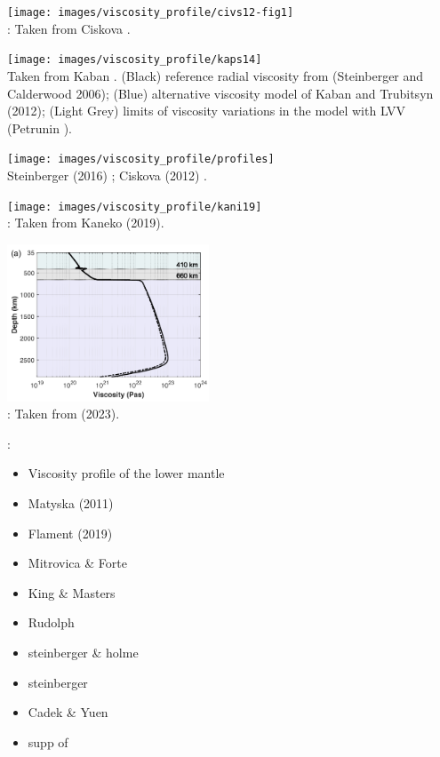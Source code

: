 \begin{center}
\texttt{[image: images/viscosity\_profile/civs12-fig1]}\\
{\captionfont \twothousandtwelve: Taken from Ciskova \etal \cite{civs12}.}
\end{center}

\begin{center}
\texttt{[image: images/viscosity\_profile/kaps14]}\\
{\captionfont \twothousandfourteen Taken from Kaban \etal  \cite{kaps14}.
(Black) reference radial viscosity from (Steinberger and Calderwood 2006); 
(Blue) alternative viscosity model of Kaban and Trubitsyn (2012); 
(Light Grey) limits of viscosity variations in the model with LVV (Petrunin ).
}
\end{center}

\begin{center}
\texttt{[image: images/viscosity\_profile/profiles]}\\
{\captionfont Steinberger (2016) \cite{stei16}; 
Ciskova \etal (2012) \cite{civs12}.}
\end{center}

\begin{center}
\texttt{[image: images/viscosity\_profile/kani19]}\\
{\captionfont \twothousandnineteen: Taken from Kaneko \etal \cite{kani19} (2019).}
\end{center}

\begin{center}
\includegraphics[width=6cm]{images/viscosity_profile/nemi23}\\
{\captionfont \twothousandtwentythree: Taken from \textcite{nemi23} (2023).}
\end{center}


\Literature:
\begin{itemize} 
\item Viscosity profile of the lower mantle \cite{elss85}
\item Matyska \etal (2011) \cite{mayw11}
\item Flament (2019) \cite{flam19}
\item Mitrovica \& Forte \cite{mifo04}
\item King \& Masters \cite{kima92}
\item Rudolph \etal \cite{rull15}
\item steinberger \& holme \cite{stho08}
\item steinberger \cite{stei16}
\item Cadek \& Yuen \cite{cayu93}
\item supp of \cite{badw17}
\end{itemize} 
